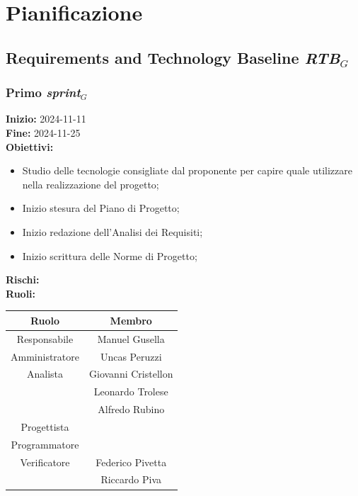 \documentclass[12pt]{article}
\begin{document}
\section{Pianificazione}
\subsection{Requirements and Technology Baseline \textit{RTB}$_G$}
\subsubsection{Primo \textit{sprint}$_G$}
\textbf{Inizio:} 2024-11-11\\ 
\textbf{Fine:} 2024-11-25\\ 
\textbf{Obiettivi:}
\begin{itemize}
\item Studio delle tecnologie consigliate dal proponente per capire quale utilizzare nella realizzazione del progetto;
\item Inizio stesura del Piano di Progetto;
\item Inizio redazione dell'Analisi dei Requisiti;
\item Inizio scrittura delle Norme di Progetto;
\end{itemize}
\textbf{Rischi:}\\
\textbf{Ruoli:}\\
\vspace{2mm}
\begin{center}
\begin{tabular}{|c|c|}
\hline
\textbf{Ruolo} & \textbf{Membro}\\
\hline
Responsabile & Manuel Gusella\\
\hline
Amministratore & Uncas Peruzzi\\ 
\hline
Analista & Giovanni Cristellon\\
& Leonardo Trolese\\
& Alfredo Rubino\\
\hline
Progettista & \\
\hline
Programmatore & \\
\hline
Verificatore & Federico Pivetta\\
& Riccardo Piva\\
\hline
\end{tabular}
\end{center}
\end{document}
